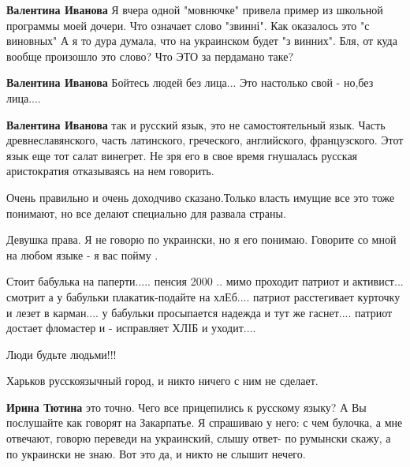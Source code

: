 \begin{itemize}
\begin{itemize}
\textbf{Валентина Иванова} Я вчера одной "мовнючке" привела пример из школьной
программы моей дочери. Что означает слово "звинні". Как оказалось это "с
виновных" А я то дура думала, что на украинском будет "з винних". Бля, от куда
вообще произошло это слово? Что ЭТО за пердамано таке?

\textbf{Валентина Иванова}
Бойтесь людей без лица...
Это настолько свой - но,без лица....

\textbf{Валентина Иванова} так и русский язык, это не самостоятельный язык. Часть древнеславянского, часть латинского, греческого, английского, французского. Этот язык еще тот салат винегрет. Не зря его в свое время гнушалась русская аристократия отказываясь на нем говорить.
\end{itemize}

Очень правильно и очень доходчиво сказано.Только власть имущие все это тоже понимают, но все делают специально для развала страны.

Девушка права. Я не говорю по украински, но я его понимаю. Говорите со мной на любом языке - я вас пойму . \Laughey[1.0][white]


Стоит бабулька на паперти..... пенсия 2000 .. мимо проходит патриот и
активист... смотрит а у бабульки плакатик-подайте на хлЕб.... патриот
расстегивает курточку и лезет в карман.... у бабульки просыпается надежда и тут
же гаснет.... патриот достает фломастер и - исправляет ХЛIБ и уходит....

Люди будьте людьми!!!

Харьков русскоязычный город, и никто ничего с ним не сделает.

\begin{itemize}
\textbf{Ирина Тютина} это точно. Чего все прицепились к русскому языку? А Вы
послушайте как говорят на Закарпатье. Я спрашиваю у него: с чем булочка, а мне
отвечают, говорю переведи на украинский, слышу ответ- по румынски скажу, а по
украински не знаю. Вот это да, и никто не слышит нечего.
\end{itemize}


\end{itemize}
